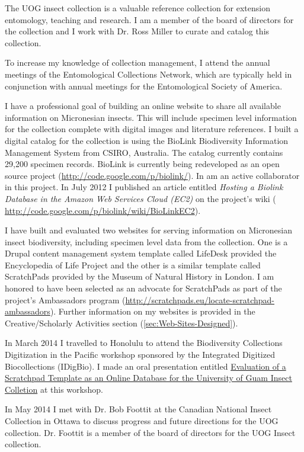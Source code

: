 \documentclass[12pt,oneside,english]{scrbook}
\begin{document}
The UOG insect collection is a valuable reference collection for extension
entomology, teaching and research. I am a member of the board of directors
for the collection and I work with Dr. Ross Miller to curate and catalog
this collection. 

To increase my knowledge of collection management, I attend the annual
meetings of the Entomological Collections Network, which are typically
held in conjunction with annual meetings for the Entomological Society
of America.

I have a professional goal of building an online website to share
all available information on Micronesian insects. This will include
specimen level information for the collection complete with digital
images and literature references. I built a digital catalog for the
collection is using the BioLink Biodiversity Information Management
System from CSIRO, Australia. The catalog currently contains 29,200
specimen records. BioLink is currently being redeveloped as an open
source project (\url{http://code.google.com/p/biolink/}). In am an active
collaborator in this project. In July 2012 I published an article
entitled \emph{Hosting a Biolink Database in the Amazon Web Services
Cloud (EC2)} on the project's wiki ( \url{http://code.google.com/p/biolink/wiki/BioLinkEC2}).

I have built and evaluated two websites for serving information on
Micronesian insect biodiversity, including specimen level data from
the collection. One is a Drupal content management system template
called LifeDesk provided the Encyclopedia of Life Project and the
other is a similar template called ScratchPads provided by the Museum
of Natural History in London. I am honored to have been selected as
an advocate for ScratchPads as part of the project's Ambassadors program
(\url{http://scratchpads.eu/locate-scratchpad-ambassadors}). Further information
on my websites is provided in the Creative/Scholarly Activities section
(\ref{sec:Web-Sites-Designed}). 

In March 2014 I travelled to Honolulu to attend the Biodiversity Collections
Digitization in the Pacific workshop sponsored by the Integrated Digitized
Biocollections (IDigBio). I made an oral presentation entitled \href{ https://www.idigbio.org/wiki/images/a/aa/Scratchpads_iDigBio-part1.pdf}{Evaluation of a Scratchpad Template as an Online Database for the University of Guam Insect Colletion} at
this workshop. 

In May 2014 I met with Dr. Bob Foottit at the Canadian National Insect
Collection in Ottawa to discuss progress and future directions for
the UOG collection. Dr. Foottit is a member of the board of directors
for the UOG Insect collection. 
\end{document}
